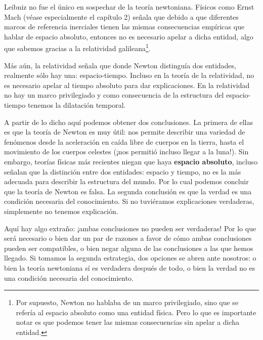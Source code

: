 \documentclass{article}
\begin{document}
Leibniz no fue el único en sospechar de la teoría newtoniana. Físicos como Ernst Mach (véase especialmente el capítulo 2) \citeyear{Mach2013} señala que debido a que diferentes marcos de referencia inerciales tienen las mismas consecuencias empíricas que hablar de espacio absoluto, entonces no es necesario apelar a dicha entidad, algo que sabemos gracias a la relatividad galileana\footnote{Por supuesto, Newton no hablaba de un marco privilegiado, sino que se refería al espacio absoluto como una entidad física. Pero lo que es importante notar es que podemos tener las mismas consecuencias sin apelar a dicha entidad.}.

Más aún, la relatividad señala que donde Newton distinguía dos entidades, realmente sólo hay una: espacio-tiempo. Incluso en la teoría de la relatividad, no es necesario apelar al tiempo absoluto para dar explicaciones. En la relatividad no hay un marco privilegiado y como consecuencia de la estructura del espacio-tiempo tenemos la dilatación temporal.

A partir de lo dicho aquí podemos obtener dos conclusiones. La primera de ellas es que la teoría de Newton es muy útil: nos permite describir una variedad de fenómenos desde la aceleración en caída libre de cuerpos en la tierra, hasta el movimiento de los cuerpos celestes (¡nos permitió incluso llegar a la luna!). Sin embargo, teorías físicas más recientes niegan que haya \textbf{espacio absoluto}, incluso señalan que la distinción entre dos entidades: espacio y tiempo, no es la más adecuada para describir la estructura del mundo. Por lo cual podemos concluir que la teoría de Newton es falsa. La segunda conclusión es que la verdad es una condición necesaria del conocimiento. Si no tuviéramos explicaciones verdaderas, simplemente no tenemos explicación. 

Aquí hay algo extraño: ¡ambas conclusiones no pueden ser verdaderas! Por lo que será necesario o bien dar un par de razones a favor de cómo ambas conclusiones pueden ser compatibles, o bien negar alguna de las conclusiones a las que hemos llegado. Si tomamos la segunda estrategia, dos opciones se abren ante nosotros: o bien la teoría newtoniana sí es verdadera después de todo, o bien la verdad no es una condición necesaria del conocimiento.
\end{document}
